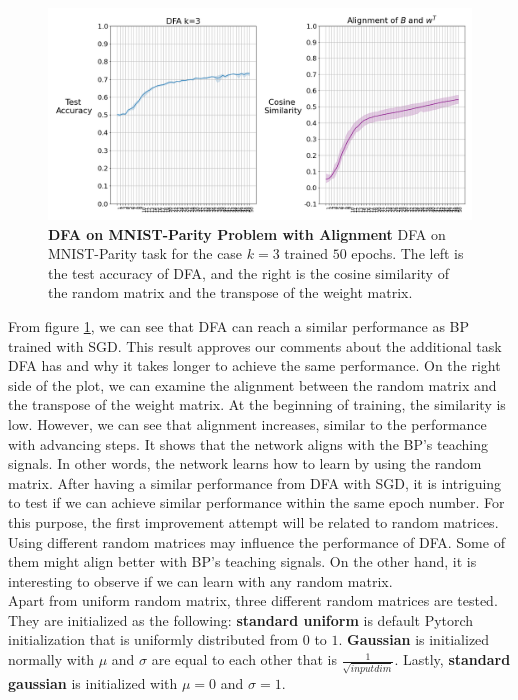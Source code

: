 \documentclass[a4paper, nobind]{templates/ociamthesis}
\begin{document}
\begin{figure}

{\centering \includegraphics[width=1\linewidth]{figures/3_k3_SGD_DFA_Alingment} 

}

\caption[DFA on MNIST-Parity Problem with Alignment]{\textbf{DFA on MNIST-Parity Problem with Alignment} \newline DFA on MNIST-Parity task for the case $k=3$ trained $50$ epochs. The left is the test accuracy of DFA, and the right is the cosine similarity of the random matrix and the transpose of the weight matrix.}\label{fig:DFA50epochs}
\end{figure}

\noindent From figure \ref{fig:DFA50epochs}, we can see that DFA can reach a similar performance as BP trained with SGD. This result approves our comments about the additional task DFA has and why it takes longer to achieve the same performance. On the right side of the plot, we can examine the alignment between the random matrix and the transpose of the weight matrix. At the beginning of training, the similarity is low. However, we can see that alignment increases, similar to the performance with advancing steps. It shows that the network aligns with the BP's teaching signals. In other words, the network learns how to learn by using the random matrix.
\noindent After having a similar performance from DFA with SGD, it is intriguing to test if we can achieve similar performance within the same epoch number. For this purpose, the first improvement attempt will be related to random matrices. Using different random matrices may influence the performance of DFA. Some of them might align better with BP's teaching signals. On the other hand, it is interesting to observe if we can learn with any random matrix.\\
Apart from uniform random matrix, three different random matrices are tested. They are initialized as the following: \textbf{standard uniform} is default Pytorch initialization that is uniformly distributed from \(0\) to \(1\). \textbf{Gaussian} is initialized normally with \(\mu\) and \(\sigma\) are equal to each other that is \(\frac{1}{\sqrt{input dim}}\). Lastly, \textbf{standard gaussian} is initialized with \(\mu=0\) and \(\sigma=1\).
\end{document}
